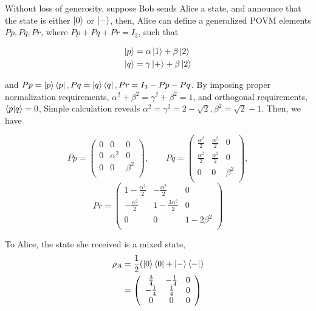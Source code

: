 \documentclass[%
 reprint,
superscriptaddress,
 amsmath,amssymb,
 aps,
]{revtex4-2}
\begin{document}
Without loss of generosity, suppose Bob sends Alice a state, and announce that the state is either $\ket{0}$ or $\ket{-}$, then, Alice can define a generalized POVM elements $Pp, Pq, Pr$, where $Pp+Pq+Pr=I_3$, such that 

\begin{equation}
\begin{split}
    \ket{p}&=\alpha\ket{1}+\beta\ket{2}\\
    \ket{q}&=\gamma\ket{+}+\beta\ket{2}\\
\end{split}
\end{equation}

and $Pp=\ket{p}\bra{p}, Pq=\ket{q}\bra{q}, Pr=I_3-Pp-Pq$. By imposing proper normalization requirements, $\alpha^2+\beta^2=\gamma^2+\beta^2=1$, and orthogonal requirements, $\bra{p}\ket{q}=0$, Simple calculation reveals $\alpha^2=\gamma^2=2-\sqrt{2}, \beta^2=\sqrt{2}-1$. Then, we have

\begin{equation}
    Pp=\left(
\begin{array}{ccc}
 0 & 0 & 0 \\
 0 & \alpha^2 & 0 \\
 0 & 0 & \beta^2 \\
\end{array}
\right), \qquad
Pq=\left(
\begin{array}{ccc}
 \frac{\alpha^2}{2} & \frac{\alpha^2}{2}
   & 0 \\
 \frac{\alpha^2}{2} & \frac{\alpha^2}{2}
   & 0 \\
 0 & 0 & \beta^2 \\
\end{array}
\right),
\end{equation}
\begin{equation}
Pr=\left(
\begin{array}{ccc}
 1-\frac{\alpha^2}{2} &
   -\frac{\alpha^2}{2} & 0 \\
 -\frac{\alpha^2}{2} & 1-\frac{3
   \alpha^2}{2} & 0 \\
 0 & 0 & 1-2 \beta^2 \\
\end{array}
\right)
\end{equation}

To Alice, the state she received is a mixed state,
\begin{equation}
\begin{split}
    \rho_A &= \frac{1}{2}(\ket{0}\bra{0}+\ket{-}\bra{-})\\
    &=\left(
\begin{array}{ccc}
 \frac{3}{4} & -\frac{1}{4} &
   0 \\
 -\frac{1}{4} & \frac{1}{4} &
   0 \\
 0 & 0 & 0 \\
\end{array}
\right)
\end{split}
\end{equation}
\end{document}
